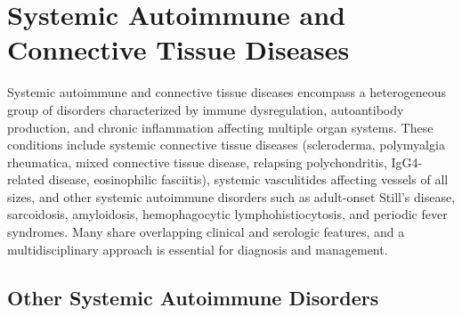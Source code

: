 \chapter{Systemic Autoimmune and Connective Tissue Diseases}
\label{ch:connective_tissue}
Systemic autoimmune and connective tissue diseases encompass a heterogeneous group of disorders characterized by immune dysregulation, autoantibody production, and chronic inflammation affecting multiple organ systems. These conditions include systemic connective tissue diseases (scleroderma, polymyalgia rheumatica, mixed connective tissue disease, relapsing polychondritis, IgG4-related disease, eosinophilic fasciitis), systemic vasculitides affecting vessels of all sizes, and other systemic autoimmune disorders such as adult-onset Still's disease, sarcoidosis, amyloidosis, hemophagocytic lymphohistiocytosis, and periodic fever syndromes. Many share overlapping clinical and serologic features, and a multidisciplinary approach is essential for diagnosis and management.

\section{Other Systemic Autoimmune Disorders}








\label{sec:Other Systemic Autoimmune Disorders}

